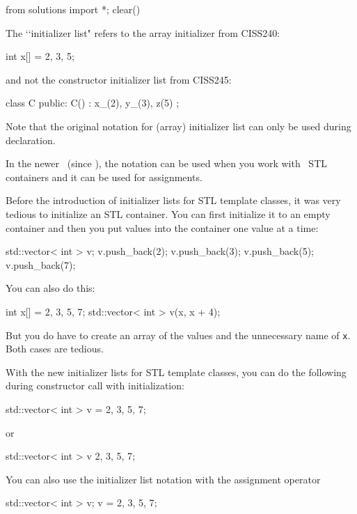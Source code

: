\begin{python0}
from solutions import *; clear()
\end{python0}

The \lq\lq initializer list" refers to the array initializer from
CISS240:
\begin{console}[fontsize=\small]
int x[] = {2, 3, 5};
\end{console}
and not the constructor initializer list from CISS245:
\begin{console}[fontsize=\small]
class C
{
public:
    C()  
    : x_(2), y_(3), z(5)
    {}
};
\end{console}
Note that the original notation for (array) initializer list
can only be used during declaration.

In the newer \cpp\ (since ), the  notation can be used
when you work with \cpp\ STL containers and it can be used for assignments.

Before the introduction of initializer lists for STL template classes,
it was very tedious to initialize an STL container.
You can first initialize it to an empty
container and then you put values into the
container one value at a time:
\begin{console}[fontsize=\footnotesize]
std::vector< int > v;
v.push_back(2);
v.push_back(3);
v.push_back(5);
v.push_back(7);
\end{console}
You can also do this:
\begin{console}[fontsize=\footnotesize]
int x[] = {2, 3, 5, 7};
std::vector< int > v(x, x + 4);
\end{console}
But you do have to create an array of the values and the unnecessary name
of \verb!x!.
Both cases are tedious.

With the new initializer lists for STL template classes, you can do
the following during constructor call with initialization:
\begin{console}[fontsize=\footnotesize]
std::vector< int > v = {2, 3, 5, 7};
\end{console}
or
\begin{console}[fontsize=\footnotesize]
std::vector< int > v {2, 3, 5, 7};
\end{console}
You can also use the initializer list notation with the
assignment operator
\begin{console}[fontsize=\footnotesize]
std::vector< int > v;
v = {2, 3, 5, 7};
\end{console}

